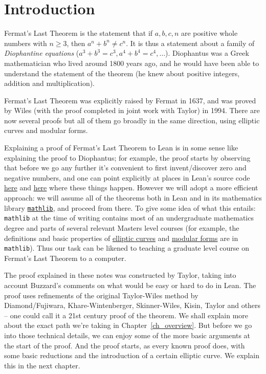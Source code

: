 \chapter{Introduction}

Fermat's Last Theorem is the statement that if $a,b,c,n$ are positive whole numbers with $n\geq 3$, then $a^n+b^n\not=c^n$. It is thus a statement about a family of \emph{Diophantine equations} ($a^3+b^3=c^3, a^4+b^4=c^4,\ldots$). Diophantus was a Greek mathematician who lived around 1800 years ago, and he would have been able to understand the statement of the theorem (he knew about positive integers, addition and multiplication).

Fermat's Last Theorem was explicitly raised by Fermat in 1637, and was proved by Wiles (with the proof completed in joint work with Taylor) in 1994. There are now several proofs but all of them go broadly in the same direction, using elliptic curves and modular forms.

Explaining a proof of Fermat's Last Theorem to Lean is in some sense like explaining the proof to Diophantus; for example, the proof starts by observing that before we go any further it's convenient to first invent/discover zero and negative numbers, and one can point explicitly at places in Lean's source code \href{https://github.com/leanprover/lean4/blob/260eaebf4e804c9ac1319532970544a4e157c336/src/Init/Prelude.lean#L1049}{here} and \href{https://github.com/leanprover/lean4/blob/260eaebf4e804c9ac1319532970544a4e157c336/src/Init/Data/Int/Basic.lean#L45}{here} where these things happen. However we will adopt a more efficient approach: we will assume all of the theorems both in Lean and in its mathematics library \href{https://github.com/leanprover-community/mathlib4}{\tt mathlib}, and proceed from there. To give some idea of what this entails: {\tt mathlib} at the time of writing contains most of an undergraduate mathematics degree and parts of several relevant Masters level courses (for example, the definitions and basic properties of \href{https://leanprover-community.github.io/mathlib4_docs/Mathlib/AlgebraicGeometry/EllipticCurve/Weierstrass.html}{elliptic curves} and \href{https://leanprover-community.github.io/mathlib4_docs/Mathlib/NumberTheory/ModularForms/Basic.html}{modular forms} are in {\tt mathlib}). Thus our task can be likened to teaching a graduate level course on Fermat's Last Theorem to a computer.

The proof explained in these notes was constructed by Taylor, taking into account Buzzard's comments on what would be easy or hard to do in Lean. The proof uses refinements of the original Taylor-Wiles method by Diamond/Fujiwara, Khare-Wintenberger, Skinner-Wiles, Kisin, Taylor and others -- one could call it a 21st century proof of the theorem. We shall explain more about the exact path we're taking in Chapter~\ref{ch_overview}. But before we go into those technical details, we can enjoy some of the more basic arguments at the start of the proof. And the proof starts, as every known proof does, with some basic reductions and the introduction of a certain elliptic curve. We explain this in the next chapter.
